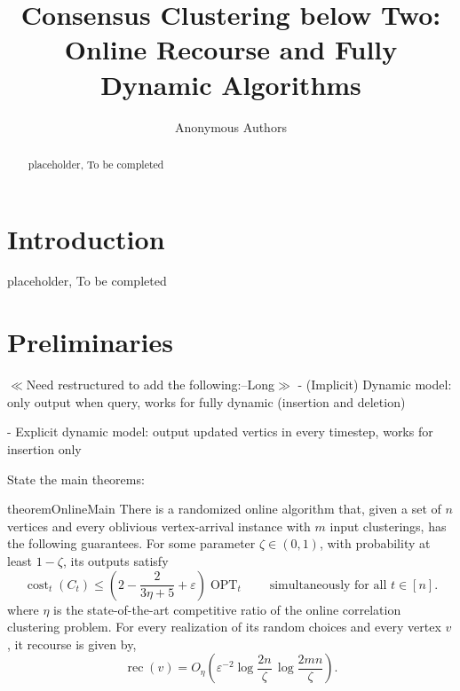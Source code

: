 \documentclass[11pt]{article}
\title{Consensus Clustering below Two:\\
Online Recourse and Fully Dynamic Algorithms}
\author{Anonymous Authors}
\date{}
\theoremstyle{definition}
\theoremstyle{remark}
\newcommand{\OPT}{\operatorname{OPT}}
\newcommand{\cost}{\operatorname{cost}}
\newcommand{\eps}{\varepsilon}
\newcommand{\1}{\mathbf{1}}
\newcommand{\colnote}[3]{\textcolor{#1}{$\ll$\textsf{#2}$\gg$\marginpar{\tiny\bf #3}}}
\newcommand{\tienlong}[1]{\colnote{greenlantern}{#1--Long}{TL}}
\begin{document}
\maketitle

\begin{abstract}
placeholder, To be completed
\end{abstract}

\section{Introduction}\label{sec:introduction}

placeholder, To be completed

\section{Preliminaries}\label{sec:preliminaries}

\tienlong{Need restructured to add the following:}
- (Implicit) Dynamic model: only output when query, works for fully dynamic (insertion and deletion)

- Explicit dynamic model: output updated vertics in every timestep, works for insertion only 

State the main theorems:

\begin{restatable}{theorem}{OnlineMain}\label{thm:online-main}
There is a randomized online algorithm that, given a set of $n$ vertices and every oblivious vertex-arrival instance with $m$ input clusterings,
has the following guarantees. For some parameter $\zeta \in (0, 1)$, with probability at least $1-\zeta$,
its outputs satisfy
\begin{equation}\label{eq:online-ratio}
  \cost_t(C_t)
  \le
  \left(2-\frac{2}{3\eta+5}+\eps\right)\OPT_t
  \qquad\text{simultaneously for all }t\in[n].
\end{equation}
where $\eta$ is the state-of-the-art competitive ratio of the online correlation clustering problem.
For every realization of its random choices and every vertex $v$, it recourse is given by,
\begin{equation}\label{eq:online-recourse-main}
  \operatorname{rec}(v)
  =
  O_{\eta}\!\left(
    \eps^{-2}
    \log\frac{2n}{\zeta}\,
    \log\frac{2mn}{\zeta}
  \right).
\end{equation}

\end{restatable}
\end{document}
